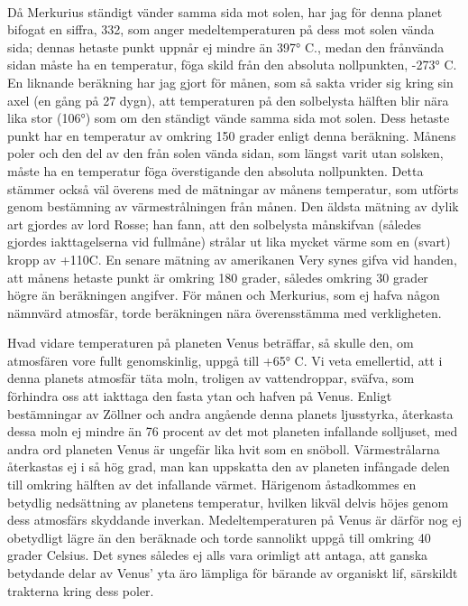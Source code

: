 \documentclass[a4paper, 12pt, oneside, swedish]{article}
\begin{document}
\paragraph{}
Då Merkurius ständigt vänder samma sida mot solen, har jag för denna planet bifogat en siffra, 332, som anger medeltemperaturen på dess mot solen vända sida; dennas hetaste punkt uppnår ej mindre än 397° C., medan den frånvända sidan måste ha en temperatur, föga skild från den absoluta nollpunkten, -273° C. En liknande beräkning har jag gjort för månen, som så sakta vrider sig kring sin axel (en gång på 27 dygn), att temperaturen på den solbelysta hälften blir nära lika stor (106°) som om den ständigt vände samma sida mot solen. Dess hetaste punkt har en temperatur av omkring 150 grader enligt denna beräkning. Månens poler och den del av den från solen vända sidan, som längst varit utan solsken, måste ha en temperatur föga överstigande den absoluta nollpunkten. Detta stämmer också väl överens med de mätningar av månens temperatur, som utförts genom bestämning av värmestrålningen från månen. Den äldsta mätning av dylik art gjordes av lord Rosse; han fann, att den solbelysta månskifvan (således gjordes iakttagelserna vid fullmåne) strålar ut lika mycket värme som en (svart) kropp av +110C. En senare mätning av amerikanen Very synes gifva vid handen, att månens hetaste punkt är omkring 180 grader, således omkring 30 grader högre än beräkningen angifver. För månen och Merkurius, som ej hafva någon nämnvärd atmosfär, torde beräkningen nära överensstämma med verkligheten.

Hvad vidare temperaturen på planeten Venus beträffar, så skulle den, om atmosfären vore fullt genomskinlig, uppgå till +65° C. Vi veta emellertid, att i denna planets atmosfär täta moln, troligen av vattendroppar, sväfva, som förhindra oss att iakttaga den fasta ytan och hafven på Venus. Enligt bestämningar av Zöllner och andra angående denna planets ljusstyrka, återkasta dessa moln ej mindre än 76 procent av det mot planeten infallande solljuset, med andra ord planeten Venus är ungefär lika hvit som en snöboll. Värmestrålarna återkastas ej i så hög grad, man kan uppskatta den av planeten infångade delen till omkring hälften av det infallande värmet. Härigenom åstadkommes en betydlig nedsättning av planetens temperatur, hvilken likväl delvis höjes genom dess atmosfärs skyddande inverkan. Medeltemperaturen på Venus är därför nog ej obetydligt lägre än den beräknade och torde sannolikt uppgå till omkring 40 grader Celsius. Det synes således ej alls vara orimligt att antaga, att ganska betydande delar av Venus' yta äro lämpliga för bärande av organiskt lif, särskildt trakterna kring dess poler.
\end{document}
